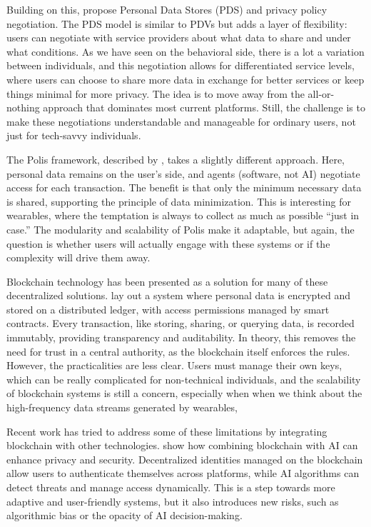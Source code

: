 	Building on this, \cite{Papadopoulou2015} propose Personal Data Stores (PDS) and privacy policy negotiation. The PDS model is similar to PDVs but adds a layer of flexibility: users can negotiate with service providers about what data to share and under what conditions. As we have seen on the behavioral side, there is a lot a variation between individuals, and this negotiation allows for differentiated service levels, where users can choose to share more data in exchange for better services or keep things minimal for more privacy. The idea is to move away from the all-or-nothing approach that dominates most current platforms. Still, the challenge is to make these negotiations understandable and manageable for ordinary users, not just for tech-savvy individuals.

	The Polis framework, described by \cite{Efraimidis2008}, takes a slightly different approach. Here, personal data remains on the user’s side, and agents (software, not AI) negotiate access for each transaction. The benefit is that only the minimum necessary data is shared, supporting the principle of data minimization. This is interesting for wearables, where the temptation is always to collect as much as possible “just in case.” The modularity and scalability of Polis make it adaptable, but again, the question is whether users will actually engage with these systems or if the complexity will drive them away.

	Blockchain technology has been presented as a solution for many of these decentralized solutions. \cite{Zyskind2015} lay out a system where personal data is encrypted and stored on a distributed ledger, with access permissions managed by smart contracts. Every transaction, like storing, sharing, or querying data, is recorded immutably, providing transparency and auditability. In theory, this removes the need for trust in a central authority, as the blockchain itself enforces the rules. However, the practicalities are less clear. Users must manage their own keys, which can be really complicated for non-technical individuals, and the scalability of blockchain systems is still a concern, especially when when we think about the high-frequency data streams generated by wearables, \cite{Boonsong2024}

	Recent work has tried to address some of these limitations by integrating blockchain with other technologies. \cite{Heister2021} show how combining blockchain with AI can enhance privacy and security. Decentralized identities managed on the blockchain allow users to authenticate themselves across platforms, while AI algorithms can detect threats and manage access dynamically. This is a step towards more adaptive and user-friendly systems, but it also introduces new risks, such as algorithmic bias or the opacity of AI decision-making.

